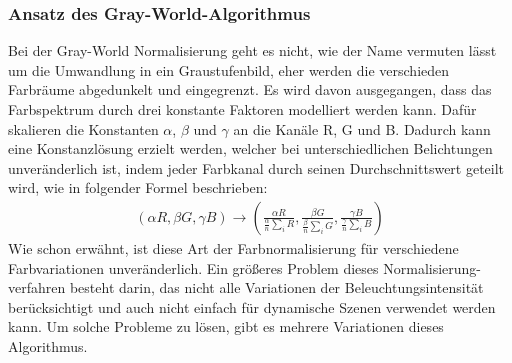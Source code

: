 \documentclass[a4paper,12pt,oneside]{article}
\begin{document}
  \subsubsection{Ansatz des Gray-World-Algorithmus}\label{s.gw}
  Bei der Gray-World Normalisierung geht es nicht, wie der Name vermuten lässt um die Umwandlung in ein Graustufenbild, eher werden die verschieden Farbräume abgedunkelt und eingegrenzt. Es wird davon ausgegangen, dass das Farbspektrum durch drei konstante Faktoren modelliert werden kann. Dafür skalieren die Konstanten $\alpha$, $\beta$ und $\gamma$ an die Kanäle R, G und B. Dadurch kann eine Konstanzlösung erzielt werden, welcher bei unterschiedlichen Belichtungen unveränderlich ist, indem jeder Farbkanal durch seinen Durchschnittswert geteilt wird, wie in folgender Formel beschrieben:
  \begin{eqnarray} (\alpha R, \beta G, \gamma B) \rightarrow\left(\frac{\alpha R} {\frac{\alpha}{n} \sum_{i} R}, \frac{\beta G} {\frac{\beta}{n} \sum_{i} G}, \frac{\gamma B} {\frac{\gamma}{n} \sum_{i} B} \right) \end{eqnarray}
  Wie schon erwähnt, ist diese Art der Farbnormalisierung für verschiedene Farbvariationen unveränderlich. Ein größeres Problem dieses Normalisierung-verfahren besteht darin, das nicht alle Variationen der Beleuchtungsintensität berücksichtigt und auch nicht einfach für dynamische Szenen verwendet werden kann. Um solche Probleme zu lösen, gibt es mehrere Variationen dieses Algorithmus.
\end{document}
